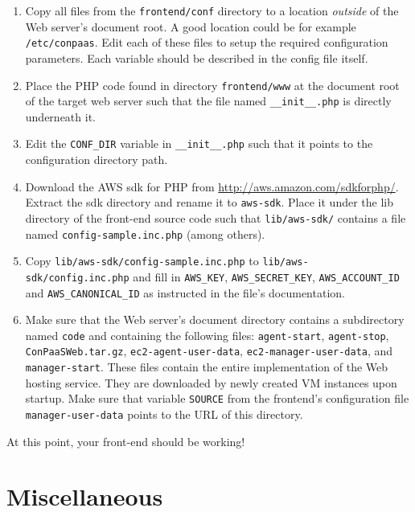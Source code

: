 \documentclass[10pt]{article}
\begin{document}
\begin{enumerate}
\item Copy all files from the \verb+frontend/conf+ directory to a
  location \emph{outside} of the Web server's document root. A good
  location could be for example \verb+/etc/conpaas+. Edit each of
  these files to setup the required configuration parameters. Each
  variable should be described in the config file itself.

\item Place the PHP code found in directory \verb+frontend/www+ at the
  document root of the target web server such that the file named
  \verb+__init__.php+ is directly underneath it.

\item Edit the \verb+CONF_DIR+ variable in \verb+__init__.php+ such
  that it points to the configuration directory path.

\item Download the AWS sdk for PHP from
  \url{http://aws.amazon.com/sdkforphp/}.  Extract the sdk directory
  and rename it to \verb+aws-sdk+. Place it under the lib directory of
  the front-end source code such that \verb+lib/aws-sdk/+ contains a
  file named \verb+config-sample.inc.php+ (among others).

\item Copy \verb+lib/aws-sdk/config-sample.inc.php+ to
  \verb+lib/aws-sdk/config.inc.php+ and fill in \verb+AWS_KEY+,
  \verb+AWS_SECRET_KEY+, \verb+AWS_ACCOUNT_ID+ and
  \verb+AWS_CANONICAL_ID+ as instructed in the file's documentation.

\item Make sure that the Web server's document directory contains a
  subdirectory named \verb+code+ and containing the following files:
  \verb+agent-start+, \verb+agent-stop+, \verb+ConPaaSWeb.tar.gz+,
  \verb+ec2-agent-user-data+, \verb+ec2-manager-user-data+, and
  \verb+manager-start+. These files contain the entire implementation
  of the Web hosting service. They are downloaded by newly created VM
  instances upon startup. Make sure that variable \verb+SOURCE+ from
  the frontend's configuration file \verb+manager-user-data+
  points to the URL of this directory.
\end{enumerate}

At this point, your front-end should be working!

\section{Miscellaneous}
\end{document}

